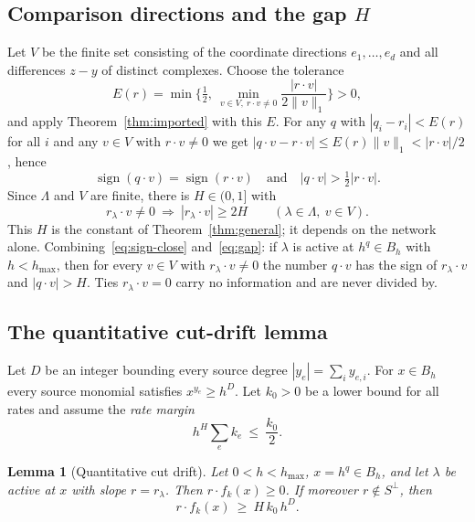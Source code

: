 \documentclass[11pt,a4paper]{article}
\theoremstyle{plain}
\newtheorem{lemma}[theorem]{Lemma}
\theoremstyle{definition}
\theoremstyle{remark}
\begin{document}
\subsection{Comparison directions and the gap \texorpdfstring{$H$}{H}}
Let $V$ be the finite set consisting of the coordinate directions $e_1,\dots,e_d$ and all differences $z-y$ of distinct complexes. Choose the tolerance
\begin{equation}\label{eq:tolerance}
 E(r)=\min\Big\{\tfrac12,\ \min_{v\in V,\ r\cdot v\ne0}\frac{|r\cdot v|}{2\|v\|_1}\Big\}>0 ,
\end{equation}
and apply Theorem~\ref{thm:imported} with this $E$. For any $q$ with $|q_i-r_i|<E(r)$ for all $i$ and any $v\in V$ with $r\cdot v\neq0$ we get $|q\cdot v-r\cdot v|\le E(r)\|v\|_1<|r\cdot v|/2$, hence
\begin{equation}\label{eq:sign-close}
 \operatorname{sign}(q\cdot v)=\operatorname{sign}(r\cdot v)\quad\text{and}\quad |q\cdot v|>\tfrac12|r\cdot v| .
\end{equation}
Since $\Lambda$ and $V$ are finite, there is $H\in(0,1]$ with
\begin{equation}\label{eq:gap}
 r_\lambda\cdot v\ne0\ \Longrightarrow\ |r_\lambda\cdot v|\ge2H\qquad(\lambda\in\Lambda,\ v\in V).
\end{equation}
This $H$ is the constant of Theorem~\ref{thm:general}; it depends on the network alone. Combining~\eqref{eq:sign-close} and~\eqref{eq:gap}: if $\lambda$ is active at $h^q\in B_h$ with $h<h_{\max}$, then for every $v\in V$ with $r_\lambda\cdot v\neq0$ the number $q\cdot v$ has the sign of $r_\lambda\cdot v$ and $|q\cdot v|>H$. Ties $r_\lambda\cdot v=0$ carry no information and are never divided by.

\subsection{The quantitative cut-drift lemma}
Let $D$ be an integer bounding every source degree $|y_e|=\sum_iy_{e,i}$. For $x\in B_h$ every source monomial satisfies $x^{y_e}\ge h^{D}$. Let $k_0>0$ be a lower bound for all rates and assume the \emph{rate margin}
\begin{equation}\label{eq:rate-margin}
 h^{H}\sum_e k_e\ \le\ \frac{k_0}{2}.
\end{equation}

\begin{lemma}[Quantitative cut drift]\label{lem:drift}
Let $0<h<h_{\max}$, $x=h^q\in B_h$, and let $\lambda$ be active at $x$ with slope $r=r_\lambda$. Then $r\cdot f_k(x)\ge0$. If moreover $r\notin S^\perp$, then
\begin{equation}\label{eq:drift}
 r\cdot f_k(x)\ \ge\ H\,k_0\,h^{D}.
\end{equation}
\end{lemma}
\end{document}
